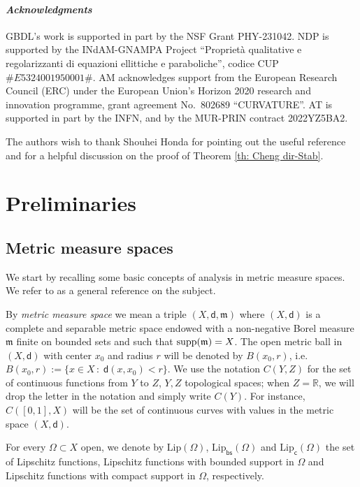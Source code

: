 \documentclass[12pt]{article}
\newcommand{\supp}{\text{\rm supp}}
\newcommand{\Lip}{\mathrm{Lip}}
\newcommand{\mm}{\mathfrak m}
\newcommand{\di}{\mathsf{d}}
\theoremstyle{plain}
\theoremstyle{definition}
\begin{document}
\medskip
\paragraph{\em\bfseries Acknowledgments} GBDL's work is supported in part
by the NSF Grant PHY-231042. NDP is supported by the INdAM-GNAMPA Project ``Proprietà qualitative e regolarizzanti di equazioni ellittiche e paraboliche'', codice CUP $\#E5324001950001\#$. 
AM acknowledges support from the European Research Council (ERC) under the European Union's Horizon 2020 research and innovation programme, grant agreement No.~802689 ``CURVATURE''. AT is supported in part by the INFN, and by the MUR-PRIN contract 2022YZ5BA2.

The authors wish to thank Shouhei Honda for pointing out the useful reference \cite[Lemma 2.10]{AH18} and for a helpful discussion on the proof of Theorem \ref{th: Cheng dir-Stab}.


\section{Preliminaries}\label{sec:prel}
\subsection{Metric measure spaces}

We start by recalling some basic concepts of analysis in metric measure spaces. We refer to \cite{AGS2} as a general reference on the subject.

By \emph{metric measure space} we mean a triple $(X,\di,\mm)$ where $(X,\di)$ is a complete and separable metric space endowed with a non-negative Borel measure $\mm$ finite on bounded sets and such that $\supp(\mm)=X$. The open metric ball in $(X,\di)$ with center $x_0$ and radius $r$ will be denoted by $B(x_0,r)$, i.e. $B(x_0,r):=\{x\in X\,:\; \di(x,x_0)<r\}$. We use the notation $C(Y,Z)$ for the set of continuous functions from $Y$ to $Z$, $Y,Z$ topological spaces; when $Z=\mathbb{R}$, we will drop the letter in the notation and simply write $C(Y)$. For instance, $C([0,1],X)$ will be the set of continuous curves with values in the metric space $(X,\di)$.

For every $\Omega\subset X$ open, we denote by $\Lip(\Omega)$,
$\Lip_{\textsf{bs}}(\Omega)$ and $\Lip_{\textsf{c}}(\Omega)$ the set of Lipschitz functions, Lipschitz functions with bounded support in $\Omega$ and Lipschitz functions with compact support in $\Omega$, respectively.
\end{document}

